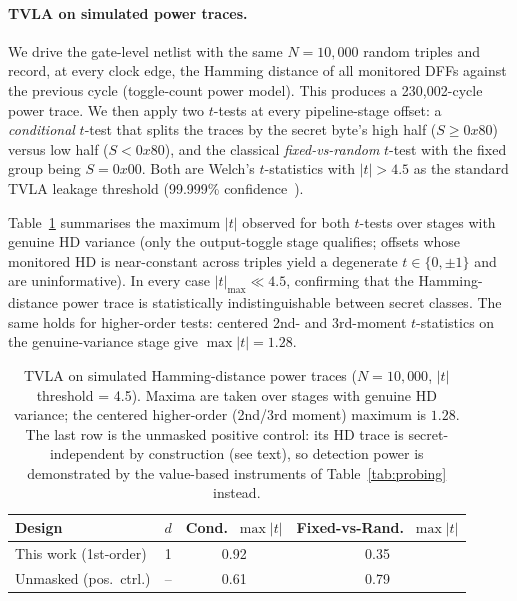 \documentclass[lettersize,journal]{IEEEtran}
\begin{document}
\paragraph{TVLA on simulated power traces.}
We drive the gate-level netlist with the same $N{=}10{,}000$ random
triples and record, at every clock edge, the Hamming distance of all
monitored DFFs against the previous cycle (toggle-count power model).  This
produces a 230,002-cycle power trace.  We then apply two
$t$-tests at every pipeline-stage offset: a \emph{conditional} $t$-test
that splits the traces by the secret byte's high half
($S \geq 0x80$) versus low half ($S < 0x80$), and the classical
\emph{fixed-vs-random} $t$-test with the fixed group being
$S = 0x00$.  Both are Welch's $t$-statistics with
$|t| > 4.5$ as the standard TVLA leakage threshold
(99.999\% confidence~\cite{goodwill2011tvla}).

Table~\ref{tab:tvla} summarises the maximum $|t|$ observed for both
$t$-tests over stages with genuine HD variance
(only the output-toggle stage qualifies; offsets whose monitored HD
is near-constant across triples yield a
degenerate $t\in\{0,\pm1\}$ and are uninformative).  In every case
$|t|_{\max} \ll 4.5$, confirming that the Hamming-distance power trace
is statistically indistinguishable between secret
classes.  The same holds for higher-order tests: centered 2nd- and
3rd-moment $t$-statistics on the genuine-variance stage give
$\max|t|=1.28$.

\begin{table}[t]
\centering
\caption{TVLA on simulated Hamming-distance power traces
($N{=}10{,}000$, $|t|$ threshold = 4.5).  Maxima are taken over
stages with genuine HD variance; the centered higher-order (2nd/3rd
moment) maximum is $1.28$.  The
last row is the unmasked positive control: its HD trace is
secret-independent by construction (see text), so detection power is
demonstrated by the value-based instruments of
Table~\ref{tab:probing} instead.}
\label{tab:tvla}
\begin{tabular}{@{}lccc@{}}
\toprule
Design & $d$ & Cond.\ $\max|t|$ & Fixed-vs-Rand.\ $\max|t|$ \\
\midrule
This work (1st-order) & 1 & 0.92 & 0.35 \\
Unmasked (pos.\ ctrl.) & -- & 0.61 & 0.79 \\
\bottomrule
\end{tabular}
\end{table}
\end{document}
